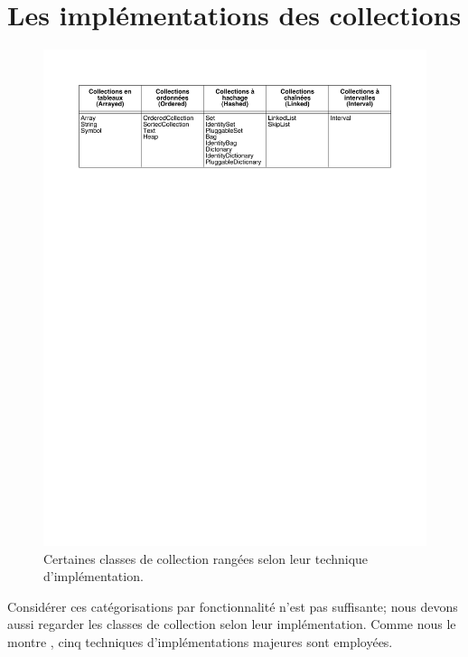 \documentclass[a4paper,10pt,twoside]{book}
\begin{document}
\section{Les impl\'ementations des collections}
\label{sec:implementation}

\begin{figure}
\begin{center}
\includegraphics[width=\textwidth]{CollectionsByImpl}
\caption{Certaines classes de collection rang\'ees selon leur technique d'impl\'ementation.
    \label{fig:collsByImpl}}
\end{center}
\end{figure}

Consid\'erer ces cat\'egorisations par fonctionnalit\'e n'est pas 
suffisante; nous devons aussi regarder les classes de collection selon
leur impl\'ementation. Comme nous le montre 
, cinq techniques d'impl\'ementations majeures 
sont employ\'ees.
\end{document}
